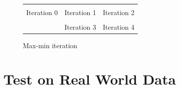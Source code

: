 \documentclass{llncs}
\begin{document}
\begin{figure}[h]
    \centering
    \begin{tabular}{lll}
          &  &  \\
         \hspace*{2em} Iteration 0 & \hspace*{2em} Iteration 1  &\hspace*{2em} Iteration 2 \\
     &  & \\
         & \hspace*{2em} Iteration 3 &\hspace*{2em} Iteration 4 \\
    \end{tabular}
    
    \caption{Max-min iteration}
    \label{fig:maxmin}
\end{figure}



\section{Test on Real World Data}


\end{document}
